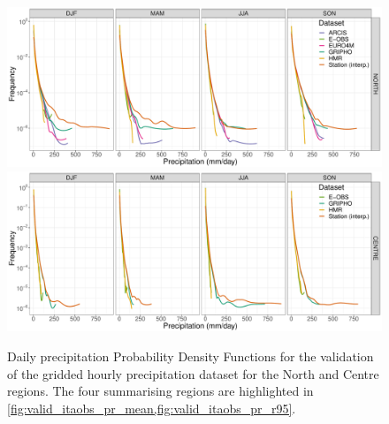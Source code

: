 \begin{figure}
    \centering
        \includegraphics[width=0.8\textheight]{figures/valid_itaobs/pdf_NORTH_lines}
        \includegraphics[width=0.8\textheight]{figures/valid_itaobs/pdf_CENTRE_lines}
    \caption[Validation of gridded hourly dataset: PDFs (1)]{
        Daily precipitation Probability Density Functions for the validation of the gridded hourly precipitation dataset for the North and Centre regions. The four summarising regions are highlighted in \cref{fig:valid_itaobs_pr_mean,fig:valid_itaobs_pr_r95}.
    }\label{fig:valid_itaobs_pr_pdf1}
\end{figure}
\afterpage{\clearpage}
